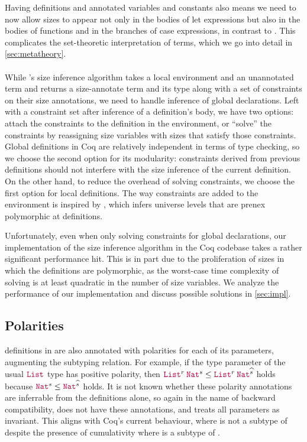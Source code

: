 Having definitions and annotated variables and constants also means we need to now allow sizes to appear
not only in the bodies of let expressions but also in the bodies of functions and in the branches of case expressions,
in contrast to \CIChatminus.
This complicates the set-theoretic interpretation of \lang terms,
which we go into detail in \autoref{sec:metatheory}.

\paragraph*{} While \CIChat's size inference algorithm takes a local environment and an unannotated term
and returns a size-annotate term and its type along with a set of constraints on their size annotations,
we need to handle inference of global declarations.
Left with a constraint set after inference of a definition's body, we have two options:
attach the constraints to the definition in the environment,
or ``solve'' the constraints by reassigning size variables with sizes that satisfy those constraints.
Global definitions in Coq are relatively independent in terms of type checking,
so we choose the second option for its modularity:
constraints derived from previous definitions should not interfere with the size inference of the current definition.
On the other hand, to reduce the overhead of solving constraints,
we choose the first option for local definitions.
The way constraints are added to the environment is inspired by \citet{universes},
which infers universe levels that are prenex polymorphic at definitions.

Unfortunately, even when only solving constraints for global declarations,
our implementation of the size inference algorithm in the Coq codebase takes a rather significant performance hit.
This is in part due to the proliferation of sizes in which the definitions are polymorphic,
as the worst-case time complexity of solving is at least quadratic in the number of size variables.
We analyze the performance of our implementation and discuss possible solutions in \autoref{sec:impl}.

\subsection{Polarities}

\Coinductive definitions in \CIChatminus are also annotated with polarities for each of its parameters, augmenting the subtyping relation.
For example, if the type parameter of the usual $\List$ type has positive polarity,
then $\app{\List^r}{\Nat^s} \leq \app{\List^r}{\Nat^{\succ{s}}}$ holds
because $\Nat^s \leq \Nat^{\succ{s}}$ holds.
It is not known whether these polarity annotations are inferrable from the \coinductive definitions alone,
so again in the name of backward compatibility, \lang does not have these annotations,
and treats all parameters as invariant.
This aligns with Coq's current behaviour, where  is not a subtype of 
despite the presence of cumulativity where  is a subtype of .

